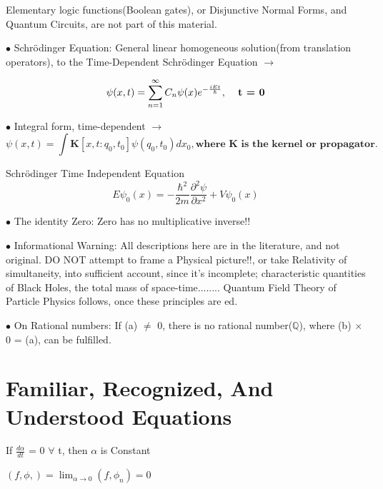 \documentclass[a4paper, 10pt, onepage]{elegantbook}
\begin{document}
\begin{note}

Elementary logic functions(Boolean gates), or Disjunctive Normal Forms, and Quantum Circuits, are not part of this 
material.

$\bullet$ Schr\"odinger Equation: General linear homogeneous solution(from translation operators),
to the Time-Dependent Schr\"odinger Equation $\longrightarrow$

\begin{equation}
\psi(x,t) = \sum_{n = 1}^\infty C_n \psi(x) e^{- \frac{i E t}{\hbar}}, \mathbf{\textbf{\quad t = 0}}
\end{equation}

$\bullet$ Integral form, time-dependent $\longrightarrow$
\begin{equation}
\psi(x,t) = \int \mathbf K[x,t:q_0,t_0]\psi(q_0,t_0)dx_0, \mathbf{\textbf{where K is the kernel or propagator}}.
\end{equation}

Schr\"odinger Time Independent Equation
\begin{equation}
\boxed{E \psi_0 (x) = - \frac{\hbar^2}{2m} \frac{\partial^2 \psi}{\partial x^2}  + V \psi_0 (x)}
\end{equation}


$\bullet$ The identity Zero: Zero has no multiplicative inverse!!

$\bullet$ Informational Warning: All descriptions here are in the literature, and not original.
DO NOT attempt to frame a Physical picture!!, or take Relativity of simultaneity, into sufficient account, since it's 
incomplete;
characteristic quantities of Black Holes, the total mass of space-time........
Quantum Field Theory of Particle Physics follows, once these principles are ed.

$\bullet$ On Rational numbers: If (a) $\neq$ 0, there is no rational number($\mathbb Q$), where (b) $\times$ 0 = (a), 
can be fulfilled.



\chapter{\textbf{Familiar, Recognized, And Understood Equations}}
\label{ch:Familiar, recognized, and understood equations}

 If $ \frac{d \alpha} {dt} $ = 0 $\forall$ t, then $\alpha$ is Constant

 $(f,\phi,) = \lim_{\alpha \to 0} (f, \phi_n) = 0 $


\end{note}
\end{document}
